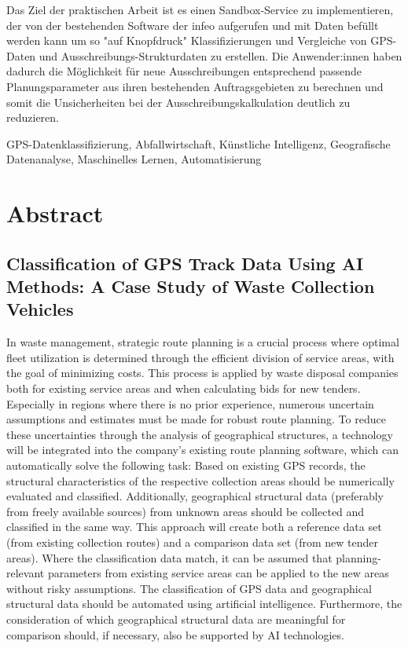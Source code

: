 \documentclass[a4paper,12pt,twoside]{scrreprt}
\begin{document}
Das Ziel der praktischen Arbeit ist es einen Sandbox-Service zu implementieren, der von der bestehenden Software der infeo aufgerufen und mit Daten befüllt werden kann um so "auf Knopfdruck" Klassifizierungen und Vergleiche von GPS-Daten und Ausschreibungs-Strukturdaten zu erstellen. Die Anwender:innen haben dadurch die Möglichkeit für neue Ausschreibungen entsprechend passende Planungsparameter aus ihren bestehenden Auftragsgebieten zu berechnen und somit die Unsicherheiten bei der Ausschreibungskalkulation deutlich zu reduzieren.

\vspace{0.5cm}

\noindent
GPS-Datenklassifizierung, Abfallwirtschaft, Künstliche Intelligenz, Geografische Datenanalyse, Maschinelles Lernen, Automatisierung

\newpage
\section*{Abstract}
\subsection*{Classification of GPS Track Data Using AI Methods: A Case Study of Waste Collection Vehicles}

In waste management, strategic route planning is a crucial process where optimal fleet utilization is determined through the efficient division of service areas, with the goal of minimizing costs. This process is applied by waste disposal companies both for existing service areas and when calculating bids for new tenders. Especially in regions where there is no prior experience, numerous uncertain assumptions and estimates must be made for robust route planning. To reduce these uncertainties through the analysis of geographical structures, a technology will be integrated into the company’s existing route planning software, which can automatically solve the following task: Based on existing GPS records, the structural characteristics of the respective collection areas should be numerically evaluated and classified. Additionally, geographical structural data (preferably from freely available sources) from unknown areas should be collected and classified in the same way. This approach will create both a reference data set (from existing collection routes) and a comparison data set (from new tender areas). Where the classification data match, it can be assumed that planning-relevant parameters from existing service areas can be applied to the new areas without risky assumptions. The classification of GPS data and geographical structural data should be automated using artificial intelligence. Furthermore, the consideration of which geographical structural data are meaningful for comparison should, if necessary, also be supported by AI technologies.
\end{document}
